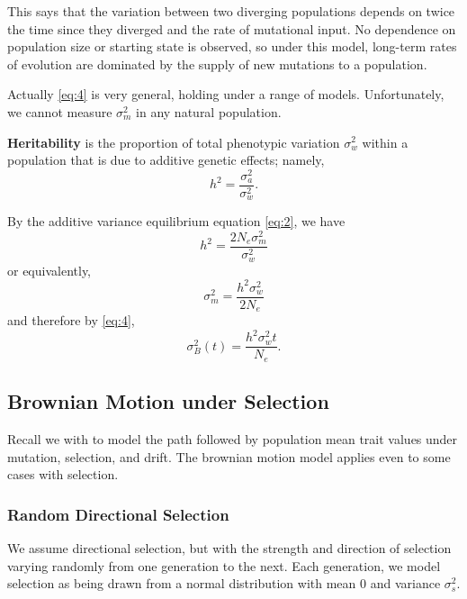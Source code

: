 \documentclass{article}
\newcommand{\advar}{\sigma_{a}^{2}} %
\newcommand{\bvar}{\sigma_{B}^{2}}  %
\newcommand{\mvar}{\sigma_{m}^{2}}  %
\newcommand{\wvar}{\sigma_{w}^{2}}  %
\newcommand{\svar}{\sigma_{s}^{2}}  %
\begin{document}
This says that the variation between two diverging populations depends on twice
the time since they diverged and the rate of mutational input. No dependence on
population size or starting state is observed, so under this model, long-term
rates of evolution are dominated by the supply of new mutations to a population.

Actually \eqref{eq:4} is very general, holding under a range of models.
Unfortunately, we cannot measure $\mvar$ in any natural population.




\begin{definition}[Heritability]
  \textbf{Heritability} is the proportion of total phenotypic variation $\wvar$
  within a population that is due to additive genetic effects; namely,
  \begin{equation}
    \label{eq:5}
    h^{2}=\frac{\advar}{\wvar}.
  \end{equation}
\end{definition}

By the additive variance equilibrium equation \eqref{eq:2}, we have
\begin{equation}
  \label{eq:6}
  h^{2}= \frac{2N_{e}\mvar}{\wvar}
\end{equation}
or equivalently,
\begin{equation}
  \label{eq:7}
  \mvar = \frac{h^{2}\wvar}{2N_{e}}
\end{equation}
and therefore by \eqref{eq:4},
\begin{equation}
  \label{eq:8}
  \bvar(t) = \frac{h^{2}\wvar t}{N_{e}}.
\end{equation}


\subsection{Brownian Motion under Selection}
Recall we with to model the path followed by population mean trait values under
mutation, selection, and drift. The brownian motion model applies even to some
cases with selection.

\subsubsection{Random Directional Selection}
We assume directional selection, but with the strength and direction of
selection varying randomly from one generation to the next. Each generation, we
model selection as being drawn from a normal distribution with mean 0 and
variance $\svar$.
\end{document}
